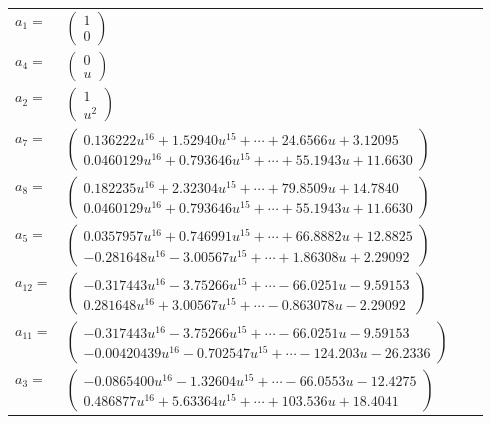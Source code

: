\documentclass[1p]{elsarticle_modified}
\theoremstyle{definition}
\begin{document}
\begin{tabular}{m{7pt} m{180pt} m{7pt} m{180pt} }
\flushright $a_{1}=$&$\begin{pmatrix}1\\0\end{pmatrix}$ \\
\flushright $a_{4}=$&$\begin{pmatrix}0\\u\end{pmatrix}$ \\
\flushright $a_{2}=$&$\begin{pmatrix}1\\u^2\end{pmatrix}$ \\
\flushright $a_{7}=$&$\begin{pmatrix}0.136222 u^{16}+1.52940 u^{15}+\cdots+24.6566 u+3.12095\\0.0460129 u^{16}+0.793646 u^{15}+\cdots+55.1943 u+11.6630\end{pmatrix}$ \\
\flushright $a_{8}=$&$\begin{pmatrix}0.182235 u^{16}+2.32304 u^{15}+\cdots+79.8509 u+14.7840\\0.0460129 u^{16}+0.793646 u^{15}+\cdots+55.1943 u+11.6630\end{pmatrix}$ \\
\flushright $a_{5}=$&$\begin{pmatrix}0.0357957 u^{16}+0.746991 u^{15}+\cdots+66.8882 u+12.8825\\-0.281648 u^{16}-3.00567 u^{15}+\cdots+1.86308 u+2.29092\end{pmatrix}$ \\
\flushright $a_{12}=$&$\begin{pmatrix}-0.317443 u^{16}-3.75266 u^{15}+\cdots-66.0251 u-9.59153\\0.281648 u^{16}+3.00567 u^{15}+\cdots-0.863078 u-2.29092\end{pmatrix}$ \\
\flushright $a_{11}=$&$\begin{pmatrix}-0.317443 u^{16}-3.75266 u^{15}+\cdots-66.0251 u-9.59153\\-0.00420439 u^{16}-0.702547 u^{15}+\cdots-124.203 u-26.2336\end{pmatrix}$ \\
\flushright $a_{3}=$&$\begin{pmatrix}-0.0865400 u^{16}-1.32604 u^{15}+\cdots-66.0553 u-12.4275\\0.486877 u^{16}+5.63364 u^{15}+\cdots+103.536 u+18.4041\end{pmatrix}$ \\

\end{tabular}
\end{document}
